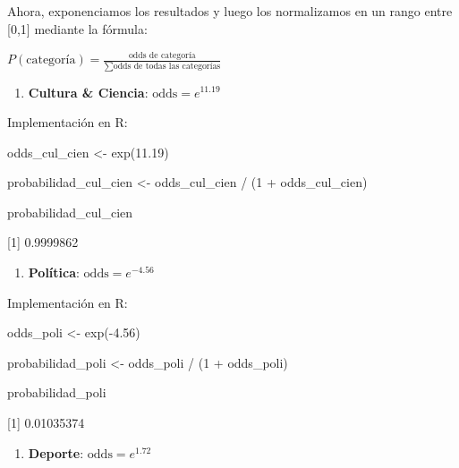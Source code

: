 \documentclass[
  12pt,
  a4paper,
]{article}
\newenvironment{Shaded}{\begin{snugshade}}{\end{snugshade}}
\newcommand{\DecValTok}[1]{\textcolor[rgb]{0.00,0.00,0.81}{#1}}
\newcommand{\FloatTok}[1]{\textcolor[rgb]{0.00,0.00,0.81}{#1}}
\newcommand{\FunctionTok}[1]{\textcolor[rgb]{0.00,0.00,0.00}{#1}}
\newcommand{\NormalTok}[1]{#1}
\newcommand{\OtherTok}[1]{\textcolor[rgb]{0.56,0.35,0.01}{#1}}
\newcommand{\SpecialCharTok}[1]{\textcolor[rgb]{0.00,0.00,0.00}{#1}}
\providecommand{\tightlist}{%
  \setlength{\itemsep}{0pt}\setlength{\parskip}{0pt}}
\begin{document}
Ahora, exponenciamos los resultados y luego los normalizamos en un rango entre {[}0,1{]} mediante la fórmula:

\(P(\text{categoría}) = \frac{\text{odds de categoría}}{\sum \text{odds de todas las categorías}}\)

\begin{enumerate}
\def\labelenumi{\roman{enumi}.}
\tightlist
\item
  \textbf{Cultura \& Ciencia}: \(\text{odds}= e^{11.19}\)
\end{enumerate}

Implementación en R:

\begin{Shaded}
\begin{Highlighting}[]
\NormalTok{odds\_cul\_cien }\OtherTok{\textless{}{-}} \FunctionTok{exp}\NormalTok{(}\FloatTok{11.19}\NormalTok{)}

\NormalTok{probabilidad\_cul\_cien }\OtherTok{\textless{}{-}}\NormalTok{ odds\_cul\_cien }\SpecialCharTok{/}\NormalTok{ (}\DecValTok{1} \SpecialCharTok{+}\NormalTok{ odds\_cul\_cien)}

\NormalTok{probabilidad\_cul\_cien}
\end{Highlighting}
\end{Shaded}

{[}1{]} 0.9999862

\begin{enumerate}
\def\labelenumi{\roman{enumi}.}
\setcounter{enumi}{1}
\tightlist
\item
  \textbf{Política}: \(\text{odds}= e^{-4.56}\)
\end{enumerate}

Implementación en R:

\begin{Shaded}
\begin{Highlighting}[]
\NormalTok{odds\_poli }\OtherTok{\textless{}{-}} \FunctionTok{exp}\NormalTok{(}\SpecialCharTok{{-}}\FloatTok{4.56}\NormalTok{)}

\NormalTok{probabilidad\_poli }\OtherTok{\textless{}{-}}\NormalTok{ odds\_poli }\SpecialCharTok{/}\NormalTok{ (}\DecValTok{1} \SpecialCharTok{+}\NormalTok{ odds\_poli)}

\NormalTok{probabilidad\_poli}
\end{Highlighting}
\end{Shaded}

{[}1{]} 0.01035374

\begin{enumerate}
\def\labelenumi{\roman{enumi}.}
\setcounter{enumi}{2}
\tightlist
\item
  \textbf{Deporte}: \(\text{odds}= e^{1.72}\)
\end{enumerate}
\end{document}
